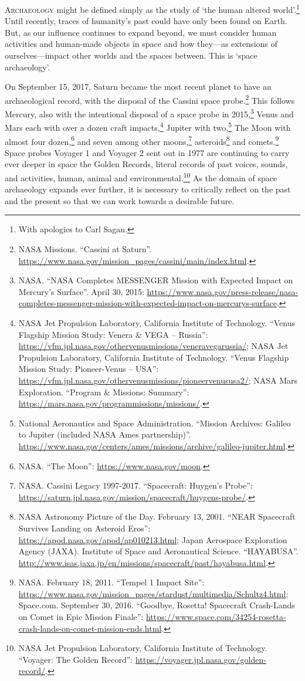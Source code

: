 \IJSRAopening
\lettrine{A}{rchaeology} might be defined simply as the study of ‘the human altered world’.\footnote{With apologies to Carl Sagan.} Until recently, traces of humanity’s past could have only been found on Earth. But, as our influence continues to expand beyond, we must consider human activities and human-made objects in space and how they—as extensions of ourselves—impact other worlds and the spaces between. This is ‘space archaeology’.

On September 15, 2017, Saturn became the most recent planet to have an archaeological record, with the disposal of the Cassini space probe.\footnote{NASA Missions. “Cassini at Saturn”. \url{https://www.nasa.gov/mission_pages/cassini/main/index.html}.}
This follows Mercury, also with the intentional disposal of a space probe in 2015,\footnote{NASA. “NASA Completes MESSENGER Mission with Expected Impact on Mercury's Surface”. April 30, 2015: \url{https://www.nasa.gov/press-release/nasa-completes-messenger-mission-with-expected-impact-on-mercurys-surface}.}
Venus and Mars each with over a dozen craft impacts,\footnote{NASA Jet Propulsion Laboratory, California Institute of Technology. “Venus Flagship Mission Study: Venera \& VEGA – Russia”: \url{https://vfm.jpl.nasa.gov/othervenusmissions/veneravegarussia/};
NASA Jet Propulsion Laboratory, California Institute of Technology. “Venus Flagship Mission Study: Pioneer-Venus – USA”: \url{https://vfm.jpl.nasa.gov/othervenusmissions/pioneervenususa2/};
NASA Mars Exploration. “Program \& Missions: Summary”: \url{https://mars.nasa.gov/programmissions/missions/}.}
Jupiter with two,\footnote{National Aeronautics and Space Administration. “Mission Archives: Galileo to Jupiter (included NASA Ames partnership)”. \url{https://www.nasa.gov/centers/ames/missions/archive/galileo-jupiter.html}.}
The Moon with almost four dozen,\footnote{NASA. “The Moon”: \url{https://www.nasa.gov/moon}.}
and seven among other moons,\footnote{NASA. Cassini Legacy 1997-2017. “Spacecraft: Huygen’s Probe”: \url{https://saturn.jpl.nasa.gov/mission/spacecraft/huygens-probe/}.}
asteroids\footnote{NASA Astronomy Picture of the Day. February 13, 2001. “NEAR Spacecraft Survives Landing on Asteroid Eros”: \url{https://apod.nasa.gov/apod/ap010213.html};
 Japan Aerospace Exploration Agency (JAXA). Institute of Space and Aeronautical Science. “HAYABUSA”. \url{http://www.isas.jaxa.jp/en/missions/spacecraft/past/hayabusa.html}.}
and comets.\footnote{NASA. February 18, 2011. “Tempel 1 Impact Site”: \url{https://www.nasa.gov/mission_pages/stardust/multimedia/Schultz4.html};
 Space.com. September 30, 2016. “Goodbye, Rosetta! Spacecraft Crash-Lands on Comet in Epic Mission Finale”: \url{https://www.space.com/34254-rosetta-crash-lands-on-comet-mission-ends.html}.}
Space probes Voyager 1 and Voyager 2 sent out in 1977 are continuing to carry ever deeper in space the Golden Records, literal records of past voices, sounds, and activities, human, animal and environmental.\footnote{NASA Jet Propulsion Laboratory, California Institute of Technology. “Voyager: The Golden Record”: \url{https://voyager.jpl.nasa.gov/golden-record/}.}
As the domain of space archaeology expands ever further, it is necessary to critically reflect on the past and the present so that we can work towards a desirable future.

